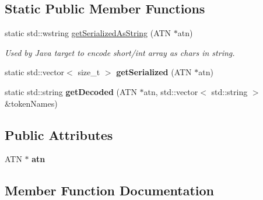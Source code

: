 \subsection*{Static Public Member Functions}
\begin{DoxyCompactItemize}
\item 
\mbox{\label{classantlr4_1_1atn_1_1ATNSerializer_a837138e7a36404f8397569f95e4e98bc}} 
static std\+::wstring \hyperlink{classantlr4_1_1atn_1_1ATNSerializer_a837138e7a36404f8397569f95e4e98bc}{get\+Serialized\+As\+String} (A\+TN $\ast$atn)
\begin{DoxyCompactList}\small\item\em Used by Java target to encode short/int array as chars in string. \end{DoxyCompactList}\item 
\mbox{\label{classantlr4_1_1atn_1_1ATNSerializer_acc79fa1515109ef7edbb54278fdbb1a9}} 
static std\+::vector$<$ size\+\_\+t $>$ {\bfseries get\+Serialized} (A\+TN $\ast$atn)
\item 
\mbox{\label{classantlr4_1_1atn_1_1ATNSerializer_a9664559456e4c5babc1a6f650a1bbcb7}} 
static std\+::string {\bfseries get\+Decoded} (A\+TN $\ast$atn, std\+::vector$<$ std\+::string $>$ \&token\+Names)
\end{DoxyCompactItemize}
\subsection*{Public Attributes}
\begin{DoxyCompactItemize}
\item 
\mbox{\label{classantlr4_1_1atn_1_1ATNSerializer_a8d94c9a858d576727244bbe896fe52c7}} 
A\+TN $\ast$ {\bfseries atn}
\end{DoxyCompactItemize}


\subsection{Member Function Documentation}
\mbox{\label{classantlr4_1_1atn_1_1ATNSerializer_ae4d16b888446eddfd0faaf5356d6d884}} 
